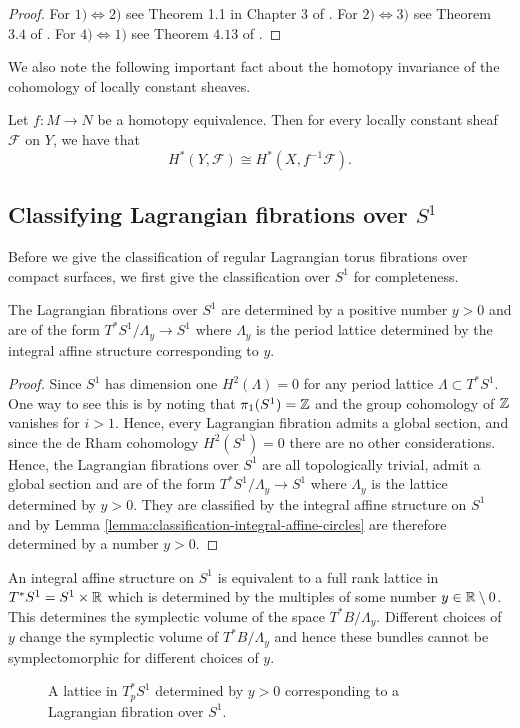 \begin{proof}
    For $1) \iff 2)$ see Theorem 1.1 in Chapter 3 of \cite{bredon1997sheaf}. For $2) \iff 3)$ see Theorem $3.4$ of \cite{whitehead1978elements}.
    For $4) \iff 1)$ see Theorem $4.13$ of \cite{bredon1997sheaf}.
\end{proof}

We also note the following important fact about the homotopy invariance of the
cohomology of locally constant sheaves.

\begin{theorem}\label{thm:homo-inv}
    Let $f: M \to N$ be a homotopy equivalence. Then for every locally constant sheaf $\mathcal{F}$ on $Y$, we have that
    $$
        H^*(Y, \mathcal{F}) \cong H^*(X, f^{-1}\mathcal{F}).
    $$
\end{theorem}

\subsection{Classifying Lagrangian fibrations over $S^1$}
Before we give the classification of regular Lagrangian torus fibrations over
compact surfaces, we first give the classification over $S^1$ for completeness.
\begin{lemma}
    The Lagrangian fibrations over $S^1$ are determined by a positive number $y>0$ and are of the form $T^*S^1/\Lambda_y \to S^1$ where $\Lambda_y$ is the period lattice determined by the integral affine structure corresponding to $y$.
\end{lemma}
\begin{proof}
    Since $S^1$ has dimension one $H^2(\Lambda) = 0$ for any period lattice $\Lambda \subset T^*S^1$. One way to see this is by noting
    that $\pi_1(S^1) = \mathbb{Z}$ and the group cohomology of $\mathbb{Z}$ vanishes for $i>1$. Hence, every Lagrangian fibration
    admits a global section, and since the de Rham cohomology $H^2(S^1)=0$ there are no other considerations. Hence, the Lagrangian fibrations
    over $S^1$ are all topologically trivial, admit a global section and are of the form $T^*S^1/\Lambda_y \to S^1$ where $\Lambda_y$ is the lattice determined by $y>0$. They are classified by the integral affine structure on $S^1$ and by Lemma \ref{lemma:classification-integral-affine-circles} are therefore determined by
    a number $y>0$.
\end{proof}
\begin{remark}
    An integral affine structure on $S^1$ is equivalent to a full rank lattice in $T^*S^1 =  S^1 \times \mathbb{R}$ which is determined by the multiples of some number $y \in \mathbb{R}\setminus 0$. This
    determines the symplectic volume of the space $T^*B/\Lambda_y$. Different choices of $y$ change the symplectic volume of $T^*B/\Lambda_y$ and hence these bundles cannot be symplectomorphic for different choices of $y$.
\end{remark}
\begin{figure}[H]
    \centering
    \caption{A lattice in $T^*_pS^1$ determined by $y>0$ corresponding to a Lagrangian fibration over $S^1$.}
\end{figure}
